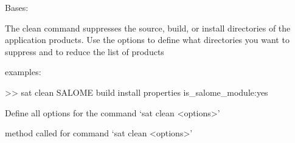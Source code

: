 \documentclass[a4paper,10pt,english]{sphinxmanual}
\begin{document}
\begin{fulllineitems}
\label{\detokenize{apidoc_commands/commands:commands.clean.Command}}
Bases: 

The clean command suppresses the source, build, or install directories 
of the application products.
Use the options to define what directories you want to suppress and 
to reduce the list of products

\begin{DUlineblock}{0em}
\item[] examples:
\item[] \textgreater{}\textgreater{} sat clean SALOME \textendash{}build \textendash{}install \textendash{}properties is\_salome\_module:yes
\end{DUlineblock}

\begin{fulllineitems}
\label{\detokenize{apidoc_commands/commands:commands.clean.Command.getParser}}
Define all options for the command ‘sat clean \textless{}options\textgreater{}’

\end{fulllineitems}


\begin{fulllineitems}
\label{\detokenize{apidoc_commands/commands:commands.clean.Command.name}}
\end{fulllineitems}


\begin{fulllineitems}
\label{\detokenize{apidoc_commands/commands:commands.clean.Command.run}}
method called for command ‘sat clean \textless{}options\textgreater{}’

\end{fulllineitems}


\end{fulllineitems}
\end{document}
